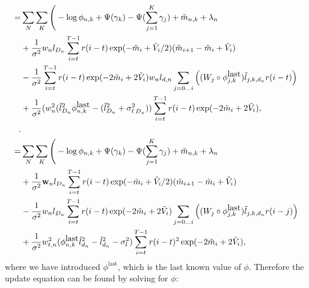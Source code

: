 \begin{align}
= & \sum_N \sum_K \Bigg( -\log{\phi_{n,k}} + \Psi(\gamma_k) - \Psi(\sum_{j=1}^K \gamma_j) + \tilde{m}_{n,k} + \lambda_n \\ \nonumber
&  + \frac{1}{\sigma^2} w_{n} l_{D_n} \sum_{i=t}^{T-1} r(i-t) \exp(-\tilde{m}_i + \tilde{V}_i / 2) (\tilde{m}_{i + 1} - \tilde{m}_i + \tilde{V}_i) \\ \nonumber
&  - \frac{1}{\sigma^2} \sum_{i=t}^{T-1} r(i-t) \exp(-2\tilde{m}_i + 2 \tilde{V}_i) w_{n} l_{d,n} \sum_{j=0\ldots i} \left( (W_{j} \circ \phi_{j,k}^{\mbox{last}}) \tilde{l}_{j,k,d_n} r(i-t) \right) \\ \nonumber
&  + \frac{1} {\sigma^2} (w_{n}^2 (\tilde{l}_{D_n}^2 \phi_{n,k}^{\mbox{last}} - (\tilde{l}_{D_n}^2 + {\sigma^2_{\ell}}_{D_n})) \sum_{i=t}^{T-1} r(i-t) \exp(-2\tilde{m}_i + 2 \tilde{V}_i), \\ \nonumber
. \\
 = & \sum_N \sum_K \Bigg( -\log{\phi_{n,k}} + \Psi(\gamma_k) - \Psi(\sum_{j=1}^K \gamma_j) + \tilde{m}_{n,k} + \lambda_n \\ \nonumber
&  + \frac{1}{\sigma^2} \textbf{w}_{n} l_{D_n} \sum_{i=t}^{T-1} r(i-t) \exp(-\tilde{m}_i + \tilde{V}_i / 2) (\tilde{m}_{i + 1} - \tilde{m}_i + \tilde{V}_i) \\ \nonumber
&  - \frac{1}{\sigma^2} w_{n} l_{D_n} \sum_{i=t}^{T-1} r(i-t) \exp(-2\tilde{m}_i + 2 \tilde{V}_i) \sum_{j=0\ldots i} \left( (W_{j} \circ \phi_{j,k}^{\mbox{last}}) \tilde{l}_{j,k,d_n} r(i-j) \right) \\ \nonumber
&  + \frac{1} {\sigma^2} w_{t,n}^2 (\phi_{n,k}^{\mbox{last}} \tilde{l}_{d_n}^2 - \tilde{l}_{d_n}^2 - \sigma_l^2) \sum_{i=t}^{T-1} r(i-t)^2 \exp(-2\tilde{m}_i + 2 \tilde{V}_i), \nonumber
\end{align}
where we have introduced $\phi^{\mbox{last}}$, which is the last known value of
$\phi$.  Therefore the update equation can be found by solving for $\phi$:
